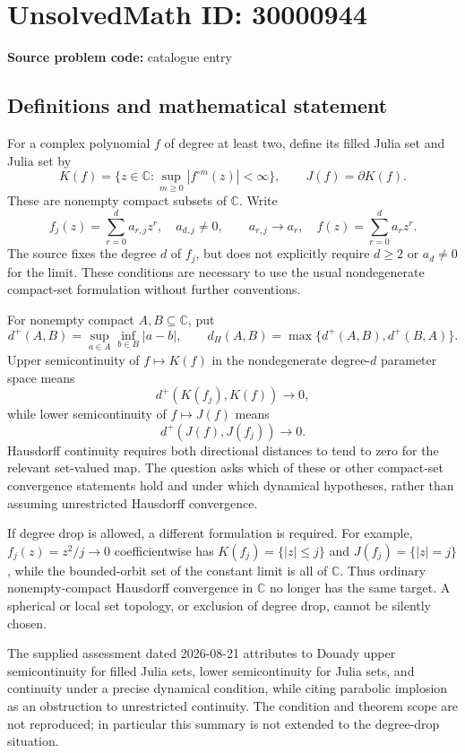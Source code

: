 \documentclass[11pt]{article}
\newcommand{\C}{\mathbb{C}}
\begin{document}
\section*{UnsolvedMath ID: 30000944}
\textbf{Source problem code:} catalogue entry
\subsection{Definitions and mathematical statement}
For a complex polynomial \(f\) of degree at least two, define its filled Julia set and Julia set by
\[
 K(f)=\{z\in\C:\sup_{m\geq0}|f^{\circ m}(z)|<\infty\},
 \qquad J(f)=\partial K(f).
\]
These are nonempty compact subsets of \(\C\). Write
\[
 f_j(z)=\sum_{r=0}^d a_{r,j}z^r,\quad a_{d,j}\ne0,\qquad
 a_{r,j}\to a_r,\quad f(z)=\sum_{r=0}^d a_rz^r.
\]
The source fixes the degree \(d\) of \(f_j\), but does not explicitly require \(d\geq2\) or \(a_d\ne0\) for the limit. These conditions are necessary to use the usual nondegenerate compact-set formulation without further conventions.

For nonempty compact \(A,B\subseteq\C\), put
\[
 d^+(A,B)=\sup_{a\in A}\inf_{b\in B}|a-b|,
 \qquad d_H(A,B)=\max\{d^+(A,B),d^+(B,A)\}.
\]
Upper semicontinuity of \(f\mapsto K(f)\) in the nondegenerate degree-\(d\) parameter space means
\[
 d^+(K(f_j),K(f))\longrightarrow0,
\]
while lower semicontinuity of \(f\mapsto J(f)\) means
\[
 d^+(J(f),J(f_j))\longrightarrow0.
\]
Hausdorff continuity requires both directional distances to tend to zero for the relevant set-valued map. The question asks which of these or other compact-set convergence statements hold and under which dynamical hypotheses, rather than assuming unrestricted Hausdorff convergence.

If degree drop is allowed, a different formulation is required. For example, \(f_j(z)=z^2/j\to0\) coefficientwise has \(K(f_j)=\{|z|\leq j\}\) and \(J(f_j)=\{|z|=j\}\), while the bounded-orbit set of the constant limit is all of \(\C\). Thus ordinary nonempty-compact Hausdorff convergence in \(\C\) no longer has the same target. A spherical or local set topology, or exclusion of degree drop, cannot be silently chosen.

The supplied assessment dated 2026-08-21 attributes to Douady upper semicontinuity for filled Julia sets, lower semicontinuity for Julia sets, and continuity under a precise dynamical condition, while citing parabolic implosion as an obstruction to unrestricted continuity. The condition and theorem scope are not reproduced; in particular this summary is not extended to the degree-drop situation.
\end{document}
